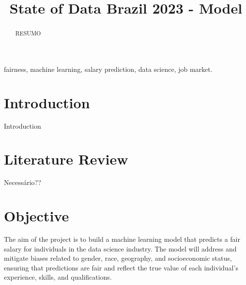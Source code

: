 \documentclass[conference]{IEEEtran}
\begin{document}
\title{State of Data Brazil 2023 - Model}

\author{
\and
{}
\and
{}
}

\maketitle

\begin{abstract}
RESUMO
\end{abstract}

\begin{IEEEkeywords}
fairness, machine learning, salary prediction, data science, job market.
\end{IEEEkeywords}

\section{Introduction}
Introduction

\section{Literature Review}
Necessário??

\section{Objective}
The aim of the project is to build a machine learning model that predicts a fair salary for individuals in the data science industry. The model will address and mitigate biases related to gender, race, geography, and socioeconomic status, ensuring that predictions are fair and reflect the true value of each individual's experience, skills, and qualifications.
\end{document}
